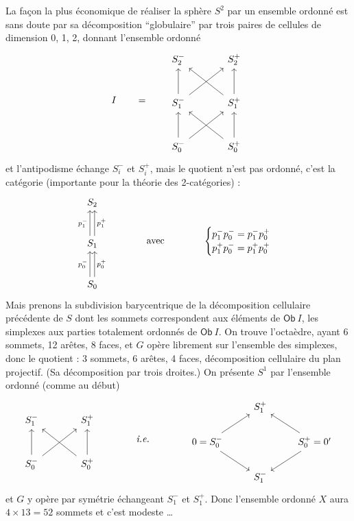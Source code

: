La façon la plus économique de réaliser la sphère $S^2$ par un ensemble ordonné est sans doute par sa décomposition ``globulaire'' par trois paires de cellules de dimension 0, 1, 2, donnant l'ensemble ordonné
\[
I \qquad = \qquad
\begin{tikzcd}[row sep=large, column sep=large]
S_2^- & S_2^+ \\
S_1^- \arrow[u] \arrow[ur] & S_1^+ \arrow[u] \arrow[ul] \\
S_0^- \arrow[u] \arrow[ur] & S_0^+ \arrow[u] \arrow[ul]
\end{tikzcd}
\]
et l'antipodisme échange $S_i^-$ et $S_i^+$, mais le quotient n'est pas ordonné, c'est la catégorie (importante pour la théorie des 2-catégories) :
\[
\begin{tikzcd}[row sep=large]
S_2 \\
S_1 \arrow[u, shift left, "p_1^-"] \arrow[u, shift right, "p_1^+"'] \\
S_0 \arrow[u, shift left, "p_0^-"] \arrow[u, shift right, "p_0^+"']
\end{tikzcd}
\qquad\qquad \text{avec} \qquad\qquad
\begin{cases}
p_1^- p_0^- = p_1^- p_0^+ \\
p_1^+ p_0^- = p_1^+ p_0^+
\end{cases}
\]
Mais prenons la subdivision barycentrique de la décomposition cellulaire précédente de $S$ dont les sommets correspondent aux éléments de $\mathsf{Ob}\ I$, les simplexes aux parties totalement ordonnés de $\mathsf{Ob}\ I$. On trouve l'octaèdre, ayant 6 sommets, 12 arêtes, 8 faces, et $G$ opère librement sur l'ensemble des simplexes, donc le quotient : 3 sommets, 6 arêtes, 4 faces, décomposition cellulaire du plan projectif. (Sa décomposition par trois droites.) On présente $S^1$ par l'ensemble ordonné (comme au début) %
\[
\begin{tikzcd}[row sep=large, column sep=large]
S_1^- & S_1^+ \\
S_0^- \arrow[u] \arrow[ur] & S_0^+ \arrow[u] \arrow[ul]
\end{tikzcd}
\qquad\qquad \textit{i.e.} \qquad\qquad
\begin{tikzcd}
 & S_1^+ & \\
0 = S_0^- \arrow[ur] \arrow[dr] & & S_0^+ = 0' \arrow[ul] \arrow[dl] \\
 & S_1^- &
\end{tikzcd}
\]
et $G$ y opère par symétrie échangeant $S_1^-$ et $S_1^+$. Donc l'ensemble ordonné $X$ aura $4 \times 13 = 52$ sommets et c'est modeste \ldots

